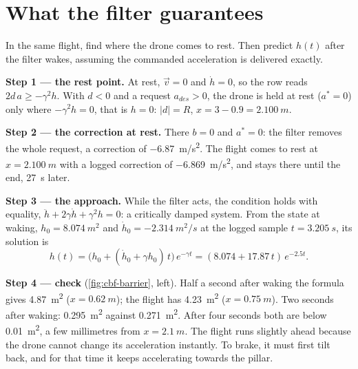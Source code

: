 \section{What the filter guarantees}

\begin{example}
\label{ex:cbf-stop}
In the same flight, find where the drone comes to rest. Then predict $h(t)$ after the filter wakes, assuming the commanded acceleration is delivered exactly.

\textbf{Step 1 — the rest point.} At rest, $\vec v = 0$ and $\dot h = 0$, so the row reads $2d\,a \ge -\gamma^2 h$. With $d < 0$ and a request $a_{des} > 0$, the drone is held at rest ($a^* = 0$) only where $-\gamma^2 h = 0$, that is $h = 0$: $|d| = R$, $x = 3 - 0.9 = \SI{2.100}{m}$.

\textbf{Step 2 — the correction at rest.} There $b = 0$ and $a^* = 0$: the filter removes the whole request, a correction of \SI{-6.87}{m/s^2}. The flight comes to rest at $x = \SI{2.100}{m}$ with a logged correction of \SI{-6.869}{m/s^2}, and stays there until the end, \SI{27}{s} later.

\textbf{Step 3 — the approach.} While the filter acts, the condition holds with equality, $\ddot h + 2\gamma\dot h + \gamma^2 h = 0$: a critically damped system. From the state at waking, $h_0 = \SI{8.074}{m^2}$ and $\dot h_0 = \SI{-2.314}{m^2/s}$ at the logged sample $t = \SI{3.205}{s}$, its solution is
\begin{equation*}
  h(t) = \big(h_0 + (\dot h_0 + \gamma h_0)\,t\big)\,e^{-\gamma t} = (8.074 + 17.87\,t)\,e^{-2.5t} .
\end{equation*}

\textbf{Step 4 — check} (\cref{fig:cbf-barrier}, left). Half a second after waking the formula gives \SI{4.87}{m^2} ($x = \SI{0.62}{m}$); the flight has \SI{4.23}{m^2} ($x = \SI{0.75}{m}$). Two seconds after waking: \SI{0.295}{m^2} against \SI{0.271}{m^2}. After four seconds both are below \SI{0.01}{m^2}, a few millimetres from $x = \SI{2.1}{m}$. The flight runs slightly ahead because the drone cannot change its acceleration instantly. To brake, it must first tilt back, and for that time it keeps accelerating towards the pillar.
\end{example}


